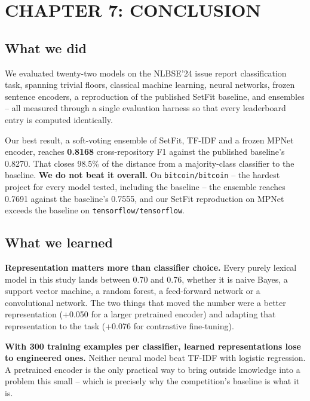 
\section*{CHAPTER 7: CONCLUSION}
\setcounter{section}{7}
\setcounter{subsection}{0}
\setcounter{figure}{0}
\setcounter{table}{0}

\subsection{What we did}

We evaluated twenty-two models on the NLBSE'24 issue report classification task, spanning trivial floors, classical machine learning, neural networks, frozen sentence encoders, a reproduction of the published SetFit baseline, and ensembles -- all measured through a single evaluation harness so that every leaderboard entry is computed identically.

Our best result, a soft-voting ensemble of SetFit, TF-IDF and a frozen MPNet encoder, reaches \textbf{0.8168} cross-repository F1 against the published baseline's 0.8270. That closes 98.5\% of the distance from a majority-class classifier to the baseline. \textbf{We do not beat it overall.} On \texttt{bitcoin/bitcoin} -- the hardest project for every model tested, including the baseline -- the ensemble reaches 0.7691 against the baseline's 0.7555, and our SetFit reproduction on MPNet exceeds the baseline on \texttt{tensorflow/tensorflow}.

\subsection{What we learned}

\textbf{Representation matters more than classifier choice.} Every purely lexical model in this study lands between 0.70 and 0.76, whether it is naive Bayes, a support vector machine, a random forest, a feed-forward network or a convolutional network. The two things that moved the number were a better representation (+0.050 for a larger pretrained encoder) and adapting that representation to the task (+0.076 for contrastive fine-tuning).

\textbf{With 300 training examples per classifier, learned representations lose to engineered ones.} Neither neural model beat TF-IDF with logistic regression. A pretrained encoder is the only practical way to bring outside knowledge into a problem this small -- which is precisely why the competition's baseline is what it is.


